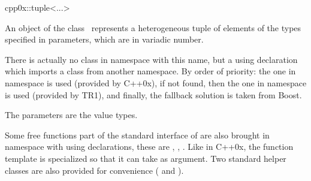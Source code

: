 

\begin{ccRefClass}{cpp0x::tuple<...>}

\ccDefinition

An object of the class \ccClassTemplateName\ represents a heterogeneous tuple of elements
of the types specified in parameters, which are in variadic number.

There is actually no class in namespace  with this name, but a using declaration which
imports a class from another namespace.  By order of priority: the one in namespace
 is used (provided by C++0x), if not found, then the one in namespace
 is used (provided by TR1), and finally, the fallback solution 
is taken from Boost.


  \ccParameters

  The parameters  are the value types.


Some free functions part of the standard interface of  are also
brought in namespace  with using declarations, these are ,
, . Like in C++0x, the  function template is
specialized so that it can take  as argument.
Two standard helper classes are also provided for convenience ( and ).

\end{ccRefClass}

\ccParDims

